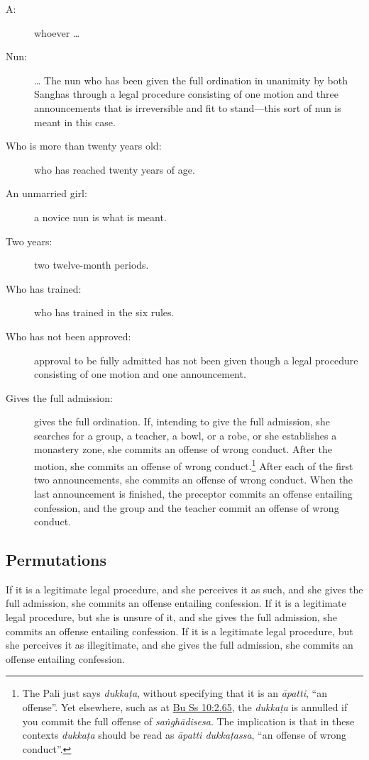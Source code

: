\documentclass[12pt,openany]{book}%
\begin{document}
\begin{description}%
\item[A: ] whoever … %
\item[Nun: ] … The nun who has been given the full ordination in unanimity by both Sanghas through a legal procedure consisting of one motion and three announcements that is irreversible and fit to stand—this sort of nun is meant in this case. %
\item[Who is more than twenty years old: ] who has reached twenty years of age. %
\item[An unmarried girl: ] a novice nun is what is meant. %
\item[Two years: ] two twelve-month periods. %
\item[Who has trained: ] who has trained in the six rules. %
\item[Who has not been approved: ] approval to be fully admitted has not been given though a legal procedure consisting of one motion and one announcement. %
\item[Gives the full admission: ] gives the full ordination. If, intending to give the full admission, she searches for a group, a teacher, a bowl, or a robe, or she establishes a monastery zone, she commits an offense of wrong conduct. After the motion, she commits an offense of wrong conduct.\footnote{The Pali just says \textit{\textsanskrit{dukkaṭa}}, without specifying that it is an \textit{\textsanskrit{āpatti}}, “an offense”. Yet elsewhere, such as at \href{https://suttacentral.net/pli-tv-bu-vb-ss10/en/brahmali\#2.65}{Bu Ss 10:2.65}, the \textit{\textsanskrit{dukkaṭa}} is annulled if you commit the full offense of \textit{\textsanskrit{saṅghādisesa}}. The implication is that in these contexts \textit{\textsanskrit{dukkaṭa}} should be read as \textit{\textsanskrit{āpatti} \textsanskrit{dukkaṭassa}}, “an offense of wrong conduct”. } After each of the first two announcements, she commits an offense of wrong conduct. When the last announcement is finished, the preceptor commits an offense entailing confession, and the group and the teacher commit an offense of wrong conduct. %
\end{description}

\subsection*{Permutations }

If it is a legitimate legal procedure, and she perceives it as such, and she gives the full admission, she commits an offense entailing confession. If it is a legitimate legal procedure, but she is unsure of it, and she gives the full admission, she commits an offense entailing confession. If it is a legitimate legal procedure, but she perceives it as illegitimate, and she gives the full admission, she commits an offense entailing confession. 
\end{document}
